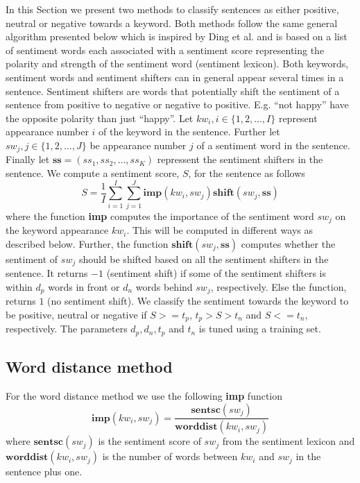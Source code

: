 \documentclass[11pt]{article}
\begin{document}
In this Section we present two methods to classify sentences as either positive, neutral or negative towards a keyword. Both methods follow the same general algorithm presented below which is inspired by Ding et al.  and is based on a list of sentiment words each associated with a sentiment score representing the polarity and strength of the sentiment word (sentiment lexicon). Both keywords, sentiment words and sentiment shifters can in general appear several times in a sentence. Sentiment shifters are words that potentially shift the sentiment of a sentence from positive to negative or negative to positive. E.g. ``not happy'' have the opposite polarity than just ``happy''. Let $kw_i, i \in \{1,2,\ldots,I\}$ represent appearance number $i$ of the keyword in the sentence. Further let $sw_{j}, j \in \{1,2,\ldots,J\}$ be appearance number $j$ of a sentiment word in the sentence. Finally let $\textbf{ss} = (ss_1, ss_2, \ldots, ss_K)$ repressent the sentiment shifters in the sentence. We compute a sentiment score, $S$, for the sentence as follows
\begin{equation}
  \label{eq:1}
  S = \frac{1}{I}\sum_{i=1}^{I} \sum_{j=1}^{J} \mathbf{imp}(kw_i, sw_{j})\mathbf{shift}(sw_{j}, \mathbf{ss})    
\end{equation}
where the function \textbf{imp} computes the importance of the sentiment word $sw_{j}$ on the keyword appearance $kw_i$. This will be computed in different ways as described below. Further, the function $\mathbf{shift}(sw_{j}, \mathbf{ss})$ computes whether the sentiment of $sw_{j}$ should be shifted based on all the sentiment shifters in the sentence. It returns $-1$ (sentiment shift) if some of the sentiment shifters is within $d_{p}$ words in front or $d_{n}$ words behind $sw_{j}$, respectively. Else the function, returns $1$ (no sentiment shift). We classify the sentiment towards the keyword to be positive, neutral or negative if $S >= t_p$,  $t_p > S > t_n$ and  $S <= t_n$, respectively. The parameters $d_p, d_n, t_p$ and $t_n$ is tuned using a training set.

\subsection{Word distance method}
\label{sec:wd}

For the word distance method we use the following \textbf{imp} function
\begin{equation}
  \label{eq:2}
  \mathbf{imp}(kw_i, sw_{j}) = \frac{\mathbf{sentsc}(sw_{j})}{\mathbf{worddist}(kw_i, sw_{j})}
\end{equation}
where $\mathbf{sentsc}(sw_{j})$ is the sentiment score of $sw_{j}$ from the sentiment lexicon and $\mathbf{worddist}(kw_i, sw_{j})$ is the number of words between $kw_i$ and $sw_{j}$ in the sentence plus one.
\end{document}
